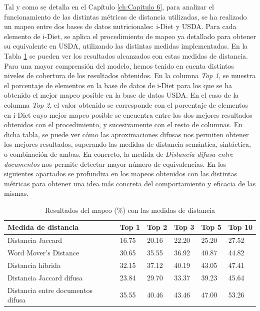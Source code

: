 Tal y como se detalla en el Capítulo \ref{ch:Capitulo 6}, para analizar el funcionamiento de las distintas métricas de distancia utilizadas, se ha realizado un mapeo entre dos bases de datos nutricionales: i-Diet y USDA. Para cada elemento de i-Diet, se aplica el procedimiento de mapeo ya detallado para obtener su equivalente en USDA, utilizando las distintas medidas implementadas. En la Tabla \ref{table8} se pueden ver los resultados alcanzados con estas medidas de distancia. Para una mayor comprensión del modelo, hemos tenido en cuenta distintos niveles de cobertura de los resultados obtenidos. En la columna \textit{Top 1}, se muestra el porcentaje de elementos en la base de datos de i-Diet para los que se ha obtenido el mejor mapeo posible en la base de datos USDA. En el caso de la columna \textit{Top 2}, el valor obtenido se corresponde con el porcentaje de elementos en i-Diet cuyo mejor mapeo posible se encuentra entre los dos mejores resultados obtenidos con el procedimiento, y sucesivamente con el resto de columnas. En dicha tabla, se puede ver cómo las aproximaciones difusas nos permiten obtener los mejores resultados, superando las medidas de distancia semántica, sintáctica, o combinación de ambas. En concreto, la medida de \textit{Distancia difusa entre documentos} nos permite detectar mayor número de equivalencias. En los siguientes apartados se profundiza en los mapeos obtenidos con las distintas métricas para obtener una idea más concreta del comportamiento y eficacia de las mismas.



\setlength{\tabcolsep}{4pt} 
\begin{table}[H]
\small
\begin{tabular}{l|l|l|l|l|l}

\textbf{Medida de distancia} & \textbf{Top 1} &\textbf{Top 2}& \textbf{Top 3} & \textbf{Top 5} & \textbf{Top 10}\\ \hline
Distancia Jaccard & 16.75 & 20.16 & 22.20 & 25.20 & 27.52 \\
Word Mover's Distance & 30.65 & 35.55 & 36.92 & 40.87 & 44.82 \\ \hline
Distancia híbrida & 32.15 & 37.12 & 40.19 & 43.05 & 47.41 \\ \hline 
Distancia Jaccard difusa & 23.84 & 29.70 & 33.37 & 39.23 & 45.64 \\ 
Distancia entre documentos difusa & 35.55 & 40.46 & 43.46 & 47.00 & 53.26 \\ 
\end{tabular}
\caption{Resultados del mapeo ($\%$) con las medidas de distancia}\label{table8}
\end{table}




